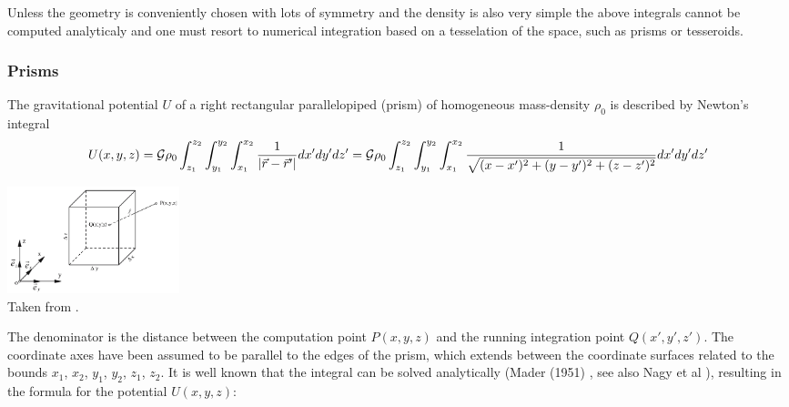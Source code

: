 
Unless the geometry is conveniently chosen with lots of symmetry and the density is also very simple the above 
integrals cannot be computed analyticaly and one must resort to numerical integration based on a tesselation of the 
space, such as prisms or tesseroids. 

\subsubsection{Prisms}
The gravitational potential $U$ of a right rectangular parallelopiped (prism) of homogeneous mass-density $\rho_0$ is
described by Newton’s integral \cite{hese07}
\[
U(x,y,z) 
= {\cal G} \rho_0 \int_{z_1}^{z_2}\int_{y_1}^{y_2}\int_{x_1}^{x_2} \frac{1}{|\vec r-\vec r'|}dx'dy'dz'
= {\cal G} \rho_0 \int_{z_1}^{z_2}\int_{y_1}^{y_2}\int_{x_1}^{x_2} \frac{1}{\sqrt{(x-x')^2+(y-y')^2+(z-z')^2} }dx'dy'dz'
\]

\begin{center}
\includegraphics[width=5cm]{images/gravity/hese07}\\
{\captionfont Taken from \cite{hese07}.}
\end{center}

The denominator is the distance between the computation point $P(x,y,z)$ 
and the running integration point $Q(x',y',z')$. 
The coordinate axes have been assumed to be parallel to the edges of the prism, which
extends between the coordinate surfaces related to the
bounds $x_1$, $x_2$, $y_1$, $y_2$, $z_1$, $z_2$.
It is well known that the integral can be solved analytically (Mader (1951) \cite{made51}, see also Nagy et al \cite{napb00,napb02}), 
resulting in the formula for the potential $U(x,y,z)$:

